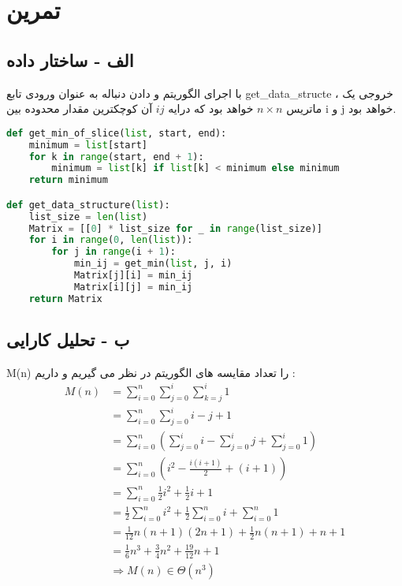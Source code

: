 \documentclass{article}
\begin{document}
\section{تمرین}
\subsection{الف - ساختار داده}
با اجرای الگوریتم و دادن دنباله به عنوان ورودی تابع get\_data\_structe
، خروجی یک ماتریس $n \times n$
خواهد بود که درایه $ij$ آن کوچکترین مقدار محدوده بین i و j خواهد بود.

\begin{latin}
\begin{lstlisting}[language=Python, caption=Python Implementation]
def get_min_of_slice(list, start, end):
    minimum = list[start]
    for k in range(start, end + 1):
        minimum = list[k] if list[k] < minimum else minimum
    return minimum

def get_data_structure(list):
    list_size = len(list)
    Matrix = [[0] * list_size for _ in range(list_size)]
    for i in range(0, len(list)):
        for j in range(i + 1):
            min_ij = get_min(list, j, i)
            Matrix[j][i] = min_ij
            Matrix[i][j] = min_ij
    return Matrix
\end{lstlisting}
\end{latin}

\subsection{ب - تحلیل کارایی}
M(n) را تعداد مقایسه های الگوریتم در نظر می گیریم
و داریم :
\begin{align}
    M(n) &= \sum_{i=0}^{n}\sum_{j=0}^{i}\sum_{k = j}^{i} 1 \\
    &= \sum_{i=0}^{n}\sum_{j=0}^{i} i-j+1 \\
    &= \sum_{i=0}^{n} \left( \sum_{j=0}^{i}i - \sum_{j=0}^{i}j + \sum_{j=0}^{i} 1  \right) \\
    &= \sum_{i=0}^{n} \left( i^2 - \frac{i(i+1)}{2} + (i + 1) \right) \\
    &= \sum_{i=0}^{n} \frac{1}{2}i^2 + \frac{1}{2}i + 1 \\
    &= \frac{1}{2}\sum_{i=0}^{n} i^2 + \frac{1}{2} \sum_{i=0}^{n}i + \sum_{i=0}^{n}1 \\
    &= \frac{1}{12}n(n+1)(2n+1) + \frac{1}{2}n(n+1) + n+1 \\
    &= \frac{1}{6}n^3 + \frac{3}{4}n^2 + \frac{19}{12}n + 1 \\
    &\Rightarrow M(n) \in \Theta(n^3)
\end{align}
\end{document}
